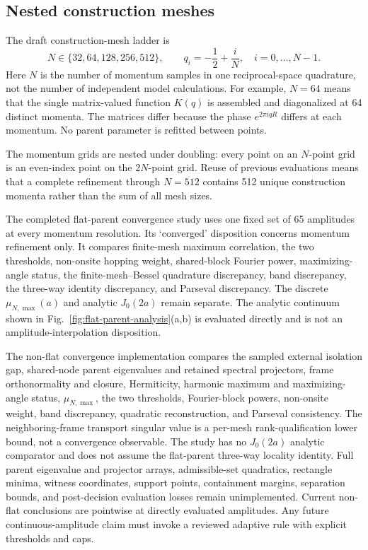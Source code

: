 \documentclass[11pt]{article}
\begin{document}
\subsection{Nested construction meshes}

The draft construction-mesh ladder is
\begin{equation}
 N\in\{32,64,128,256,512\},
 \qquad
 q_i=-\frac12+\frac{i}{N},
 \quad i=0,\ldots,N-1.
 \label{eq:construction-meshes}
\end{equation}
Here $N$ is the number of momentum samples in one reciprocal-space quadrature, not the
number of independent model calculations. For example, $N=64$ means that the single
matrix-valued function $K(q)$ is assembled and diagonalized at 64 distinct momenta. The
matrices differ because the phase $e^{2\pi iqR}$ differs at each momentum. No parent
parameter is refitted between points.

The momentum grids are nested under doubling: every point on an $N$-point grid is an
even-index point on the $2N$-point grid. Reuse of previous evaluations means that a
complete refinement through $N=512$ contains 512 unique construction momenta rather than
the sum of all mesh sizes.

The completed flat-parent convergence study uses one fixed set of 65 amplitudes at every
momentum resolution. Its `converged' disposition concerns momentum refinement only. It
compares finite-mesh maximum correlation, the two thresholds, non-onsite hopping weight,
shared-block Fourier power, maximizing-angle status, the finite-mesh--Bessel quadrature
discrepancy, band discrepancy, the three-way identity discrepancy, and Parseval discrepancy. The discrete
$\mu_{N,\max}(a)$ and analytic $J_0(2a)$ remain separate. The analytic continuum shown
in Fig.~\ref{fig:flat-parent-analysis}(a,b) is evaluated directly and is not an
amplitude-interpolation disposition.

The non-flat convergence implementation compares the sampled external isolation gap,
shared-node parent eigenvalues and retained spectral projectors, frame orthonormality and
closure, Hermiticity, harmonic maximum and maximizing-angle status, $\mu_{N,\max}$, the
two thresholds, Fourier-block powers, non-onsite weight, band discrepancy, quadratic
reconstruction, and Parseval consistency. The neighboring-frame transport singular
value is a per-mesh rank-qualification lower bound, not a convergence observable. The
study has no $J_0(2a)$ analytic comparator and does not assume the flat-parent three-way
locality identity. Full parent eigenvalue and projector arrays, admissible-set
quadratics, rectangle minima, witness coordinates,
support points, containment margins, separation bounds, and post-decision evaluation
losses remain unimplemented. Current non-flat conclusions are pointwise at directly
evaluated amplitudes. Any future continuous-amplitude claim must invoke a reviewed
adaptive rule with explicit thresholds and caps.
\end{document}
